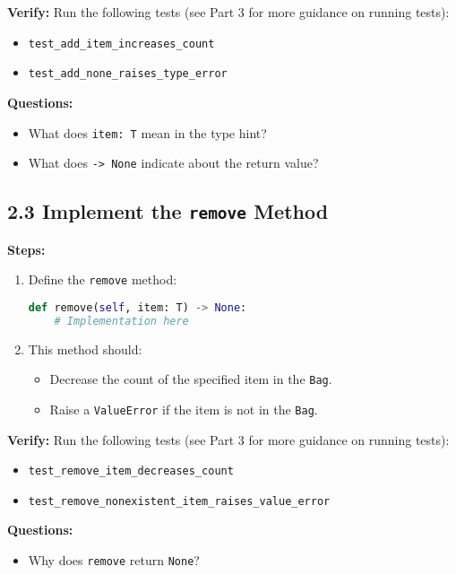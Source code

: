 \documentclass[12pt]{article}
\begin{document}
\textbf{Verify:} Run the following tests (see Part 3 for more guidance on running tests):
\begin{itemize}
    \item \texttt{test\_add\_item\_increases\_count}
    \item \texttt{test\_add\_none\_raises\_type\_error}
\end{itemize}

\textbf{Questions:}
\begin{itemize}
    \item What does \texttt{item: T} mean in the type hint?
    \item What does \texttt{-> None} indicate about the return value?
\end{itemize}

\subsection*{2.3 Implement the \texttt{remove} Method}

\textbf{Steps:}
\begin{enumerate}
    \item Define the \texttt{remove} method:
    \begin{lstlisting}[language=Python]
def remove(self, item: T) -> None:
    # Implementation here
    \end{lstlisting}
    \item This method should:
    \begin{itemize}
        \item Decrease the count of the specified item in the \texttt{Bag}.
        \item Raise a \texttt{ValueError} if the item is not in the \texttt{Bag}.
    \end{itemize}
\end{enumerate}

\textbf{Verify:} Run the following tests (see Part 3 for more guidance on running tests):
\begin{itemize}
    \item \texttt{test\_remove\_item\_decreases\_count}
    \item \texttt{test\_remove\_nonexistent\_item\_raises\_value\_error}
\end{itemize}

\textbf{Questions:}
\begin{itemize}
    \item Why does \texttt{remove} return \texttt{None}?
\end{itemize}
\end{document}
